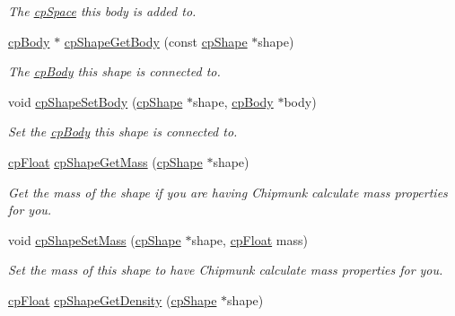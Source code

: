 \begin{DoxyCompactItemize}
\begin{DoxyCompactList}\small\item\em The \hyperlink{structcp_space}{cp\+Space} this body is added to. \end{DoxyCompactList}\item 
\hypertarget{group__cp_shape_gabf0a71b35488ed0a7c27d49701a472c9}{}\hyperlink{structcp_body}{cp\+Body} $\ast$ \hyperlink{group__cp_shape_gabf0a71b35488ed0a7c27d49701a472c9}{cp\+Shape\+Get\+Body} (const \hyperlink{structcp_shape}{cp\+Shape} $\ast$shape)\label{group__cp_shape_gabf0a71b35488ed0a7c27d49701a472c9}

\begin{DoxyCompactList}\small\item\em The \hyperlink{structcp_body}{cp\+Body} this shape is connected to. \end{DoxyCompactList}\item 
void \hyperlink{group__cp_shape_gafae3ee0e0629b9598ddeecb723b82de8}{cp\+Shape\+Set\+Body} (\hyperlink{structcp_shape}{cp\+Shape} $\ast$shape, \hyperlink{structcp_body}{cp\+Body} $\ast$body)
\begin{DoxyCompactList}\small\item\em Set the \hyperlink{structcp_body}{cp\+Body} this shape is connected to. \end{DoxyCompactList}\item 
\hypertarget{group__cp_shape_ga5d7f4b7e91b1e7062ae84acb41aa47ba}{}\hyperlink{group__basic_types_gac1ed65573e035bf892505768c852d8d3}{cp\+Float} \hyperlink{group__cp_shape_ga5d7f4b7e91b1e7062ae84acb41aa47ba}{cp\+Shape\+Get\+Mass} (\hyperlink{structcp_shape}{cp\+Shape} $\ast$shape)\label{group__cp_shape_ga5d7f4b7e91b1e7062ae84acb41aa47ba}

\begin{DoxyCompactList}\small\item\em Get the mass of the shape if you are having Chipmunk calculate mass properties for you. \end{DoxyCompactList}\item 
\hypertarget{group__cp_shape_ga16c60ccc31b32412d7eb5fd86ccb868c}{}void \hyperlink{group__cp_shape_ga16c60ccc31b32412d7eb5fd86ccb868c}{cp\+Shape\+Set\+Mass} (\hyperlink{structcp_shape}{cp\+Shape} $\ast$shape, \hyperlink{group__basic_types_gac1ed65573e035bf892505768c852d8d3}{cp\+Float} mass)\label{group__cp_shape_ga16c60ccc31b32412d7eb5fd86ccb868c}

\begin{DoxyCompactList}\small\item\em Set the mass of this shape to have Chipmunk calculate mass properties for you. \end{DoxyCompactList}\item 
\hypertarget{group__cp_shape_ga9d75af12cca24782f024efcdf8929798}{}\hyperlink{group__basic_types_gac1ed65573e035bf892505768c852d8d3}{cp\+Float} \hyperlink{group__cp_shape_ga9d75af12cca24782f024efcdf8929798}{cp\+Shape\+Get\+Density} (\hyperlink{structcp_shape}{cp\+Shape} $\ast$shape)\label{group__cp_shape_ga9d75af12cca24782f024efcdf8929798}


\end{DoxyCompactItemize}
